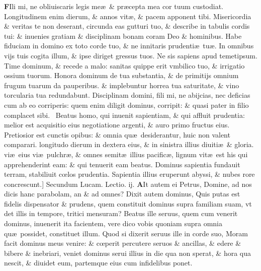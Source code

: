 \documentclass[a5paper,10pt]{book}
\def\leftmarginnote{%
	\lrmarginnote{\hskip -\marginparsep \hskip -6.5em}}
\def\rightmarginnote{%
	\lrmarginnote{\hskip\columnwidth \hskip -1em}}
\def\ae{æ}
\def\oe{œ}
\begin{document}
\begin{multicols*}{2}
\vspace{-2.25em}
\lettrine[lines=2]{\bfseries F}{}Ili\rightmarginnote{ca. 3.} mi, ne obliuiscaris legis me\ae \ \& pr\ae cepta mea cor tuum custodiat.
Longitudinem enim dierum, \& annos vit\ae , \& pacem apponent tibi.
Misericordia \& veritas te non deserant, circunda eas gutturi tuo, \& describe in tabulis cordis tui: \& inuenies gratiam \& disciplinam bonam coram Deo \& hominibus.
Habe fiduciam in domino ex toto corde tuo, \& ne innitaris prudenti\ae \ tu\ae .
In omnibus vijs tuis cogita illum, \& ipse diriget gressus tuos.
Ne sis sapiens apud temetipsum. Time dominum, \& recede a malo: sanitas quippe erit vmbilico tuo, \& irrigatio ossium tuorum.
Honora dominum de tua substantia, \& de primitijs omnium frugum tuarum da pauperibus. \& implebuntur horrea tua saturitate, \& vino torcularia tua redundabunt.
Disciplinam domini, fili mi, ne abijcias, nec deficias cum ab eo corriperis: quem enim diligit dominus, corripit: \& quasi pater in filio complacet sibi. \textdagger \ 
Beatus\leftmarginnote{\begin{flushright}B\end{flushright}} homo, qui inuenit sapientiam, \& qui affluit prudentia: melior est acquisitio eius negotiatione argenti, \& auro primo fructus eius.
Pretiosior est cunctis opibus: \& omnia qu\ae \ desiderantur, huic non valent comparari.
longitudo dierum in dextera eius, \& in sinistra illius diuiti\ae \ \& gloria.
vi\ae \ eius vi\ae \ pulchr\ae , \& omnes
semit\ae \ illius pacific\ae , lignum vit\ae \ est his qui apprehenderint eam: \& qui tenuerit eam beatus.
Dominus sapientia fundauit terram, stabiliuit c\oe los prudentia.
Sapientia illius eruperunt abyssi, \& nubes rore concrescunt.]
\newline \color{red} Secundum Lucam. \hfill Lectio. ij. \color{black}
\vspace{-.25em}
\lettrine[lines=2]{\bfseries \color{red} A}{}It\leftmarginnote{\begin{flushright}c. 12.\end{flushright}} autem ei Petrus, Domine, ad nos dicis hanc parabolam, an \& ad omnes?
Dixit autem dominus, Quis putas est fidelis dispensator \& prudens, quem constituit dominus supra familiam suam, vt det illis in tempore, tritici mensuram?
Beatus ille seruus, quem cum venerit dominus, inuenerit ita facientem, vere dico vobis quoniam supra omnia qu\ae \ possidet, constituet illum.
Quod si dixerit seruus ille in corde suo, Moram facit dominus meus venire: \& c\oe perit percutere seruos \& ancillas, \& edere \& bibere \& inebriari, veniet dominus serui illius in die qua non sperat, \& hora qua nescit, \& diuidet eum, partemque eius cum infidelibus ponet.

\end{multicols*}
\end{document}
